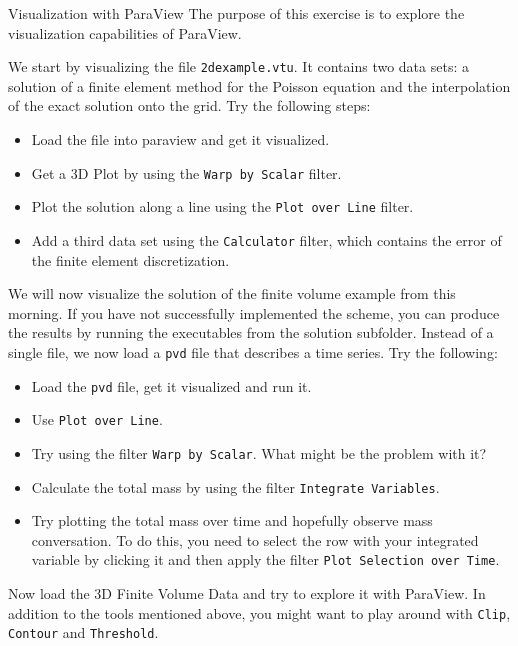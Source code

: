 \documentclass[12pt,a4paper]{article}
\begin{document}
\begin{Exercise}{Visualization with ParaView}
 The purpose of this exercise is to explore the visualization capabilities of ParaView.

 We start by visualizing the file \lstinline!2dexample.vtu!. It contains two data sets: a solution of a finite element method
 for the Poisson equation and the interpolation of the exact solution onto the grid. Try the following steps:
 \begin{itemize}
  \item Load the file into paraview and get it visualized.
  \item Get a 3D Plot by using the \lstinline!Warp by Scalar! filter.
  \item Plot the solution along a line using the \lstinline!Plot over Line! filter.
  \item Add a third data set using the \lstinline!Calculator! filter, which contains the error of the finite element discretization.
 \end{itemize}

 We will now visualize the solution of the finite volume example from this morning. If you have not successfully implemented the scheme,
 you can produce the results by running the executables from the solution subfolder. Instead of a single file, we now load a \lstinline!pvd!
 file that describes a time series. Try the following:
 \begin{itemize}
  \item Load the \lstinline!pvd! file, get it visualized and run it.
  \item Use \lstinline!Plot over Line!.
  \item Try using the filter \lstinline!Warp by Scalar!. What might be the problem with it?
  \item Calculate the total mass by using the filter \lstinline!Integrate Variables!.
  \item Try plotting the total mass over time and hopefully observe mass conversation. To do this,
  you need to select the row with your integrated variable by clicking it and then apply the filter
  \lstinline!Plot Selection over Time!.
 \end{itemize}

 Now load the 3D Finite Volume Data and try to explore it with ParaView. In addition to the tools mentioned above,
 you might want to play around with \lstinline!Clip!, \lstinline!Contour! and \lstinline!Threshold!.
\end{Exercise}
\end{document}
